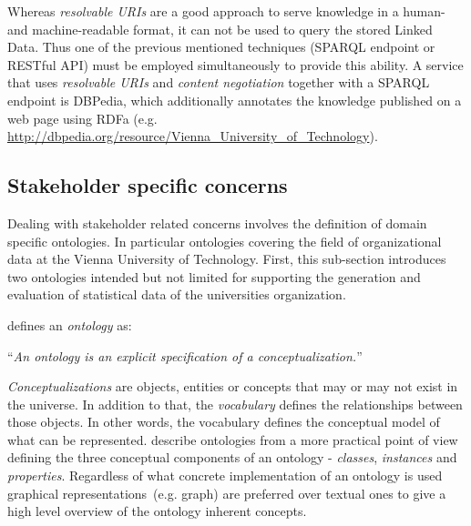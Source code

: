 \documentclass{article}
\begin{document}
Whereas \textit{resolvable URIs} are a good approach to serve knowledge in a human- and machine-readable format, it can not be used to query the stored Linked Data. Thus one of the previous mentioned techniques (SPARQL endpoint or RESTful API) must be employed simultaneously to provide this ability. A service that uses \textit{resolvable URIs} and \textit{content negotiation} together with a SPARQL endpoint is DBPedia, which additionally annotates the knowledge published on a web page using RDFa (e.g. \url{http://dbpedia.org/resource/Vienna_University_of_Technology}).


\subsection{Stakeholder specific concerns}
\label{sec:ontologies}
Dealing with stakeholder related concerns involves the definition of domain specific ontologies. In particular ontologies covering the field of organizational data at the Vienna University of Technology. First, this sub-section introduces two ontologies intended but not limited for supporting the generation and evaluation of statistical data of the universities organization. 

\citet{jour:gruber} defines an \textit{ontology} as:

``\textit{An ontology is an explicit specification of a conceptualization.}''

\textit{Conceptualizations} are objects, entities or concepts that may or may not exist in the universe. In addition to that, the \textit{vocabulary} defines the relationships between those objects. In other words, the vocabulary defines the conceptual model of what can be represented. 
\citet{jour:owl} describe ontologies from a more practical point of view defining the three conceptual components of an ontology - \textit{classes}, \textit{instances} and \textit{properties}. Regardless of what concrete implementation of an ontology is used graphical representations~(e.g. graph) are preferred over textual ones to give a high level overview of the ontology inherent concepts. 
\end{document}
